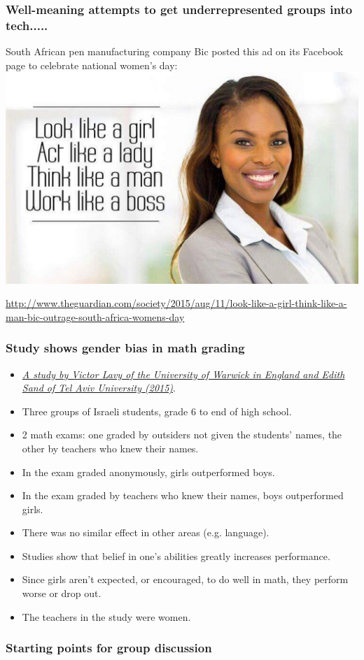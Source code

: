 \documentclass{beamer}
\begin{document}
\begin{frame}
\frametitle{Well-meaning attempts to get underrepresented groups into tech.....}
South African pen manufacturing company Bic posted this ad on its Facebook page to celebrate national women's day:
\includegraphics[scale=0.15]{thinklikeaman.jpg}

{\tiny \href{http://www.theguardian.com/society/2015/aug/11/look-like-a-girl-think-like-a-man-bic-outrage-south-africa-womens-day}{http://www.theguardian.com/society/2015/aug/11/look-like-a-girl-think-like-a-man-bic-outrage-south-africa-womens-day}}
\end{frame}

\begin{frame}
\frametitle{Study shows gender bias in math grading}
\begin{itemize}
\item {\it \href{http://www.slate.com/blogs/xx_factor/2015/02/10/teacher_bias_in_math_new_study_finds_teachers_grade_boys_more_generously.html}{A study by Victor Lavy of the University of Warwick in England and Edith Sand of Tel Aviv University (2015)}}.
\item Three groups of Israeli students, grade 6 to end of high school.
\item 2 math exams: one graded by outsiders not given the students' names, the other by teachers who knew their names.
\item In the exam graded anonymously, girls outperformed boys.
\item In  the exam graded by teachers who knew their names, boys outperformed girls.
\item There was no similar effect in other areas (e.g. language). 
\item Studies show that belief in one's abilities greatly increases performance. 
\item Since girls aren't expected, or encouraged, to do well in math, they perform worse or drop out.
\item The teachers in the study were women.
\end{itemize}
\end{frame}

\begin{frame}
\frametitle{Starting points for group discussion}

\end{frame}
\end{document}
